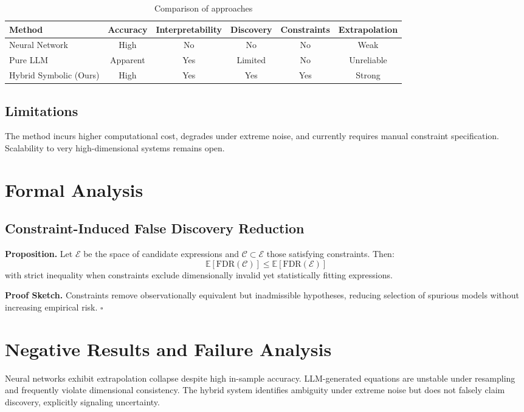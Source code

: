 \documentclass[11pt]{article}
\begin{document}
\begin{table}[h]
\centering
\begin{tabular}{lccccc}
\toprule
Method & Accuracy & Interpretability & Discovery & Constraints & Extrapolation \\
\midrule
Neural Network & High & No & No & No & Weak \\
Pure LLM & Apparent & Yes & Limited & No & Unreliable \\
Hybrid Symbolic (Ours) & High & Yes & Yes & Yes & Strong \\
\bottomrule
\end{tabular}
\caption{Comparison of approaches}
\end{table}

\subsection{Limitations}
The method incurs higher computational cost, degrades under extreme noise, and currently requires manual constraint specification. Scalability to very high-dimensional systems remains open.

\section{Formal Analysis}

\subsection{Constraint-Induced False Discovery Reduction}
\textbf{Proposition.} Let $\mathcal{E}$ be the space of candidate expressions and $\mathcal{C} \subset \mathcal{E}$ those satisfying constraints. Then:
\[
\mathbb{E}[\mathrm{FDR}(\mathcal{C})] \le \mathbb{E}[\mathrm{FDR}(\mathcal{E})]
\]
with strict inequality when constraints exclude dimensionally invalid yet statistically fitting expressions.

\textbf{Proof Sketch.} Constraints remove observationally equivalent but inadmissible hypotheses, reducing selection of spurious models without increasing empirical risk. $\square$

\section{Negative Results and Failure Analysis}
Neural networks exhibit extrapolation collapse despite high in-sample accuracy. LLM-generated equations are unstable under resampling and frequently violate dimensional consistency. The hybrid system identifies ambiguity under extreme noise but does not falsely claim discovery, explicitly signaling uncertainty.
\end{document}
